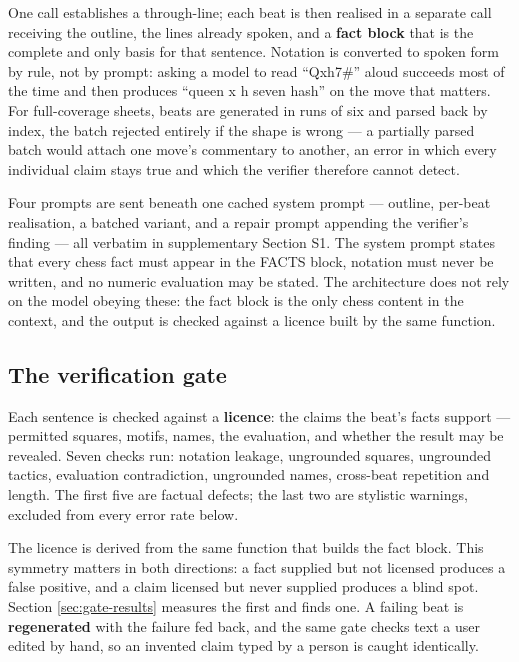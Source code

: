 \documentclass[conference]{IEEEtran}
\begin{document}
One call establishes a through-line; each beat is then realised in a
separate call receiving the outline, the lines already spoken, and a
\textbf{fact block} that is the complete and only basis for that sentence.
Notation is converted to spoken form by rule, not by prompt: asking a model
to read ``Qxh7\#'' aloud succeeds most of the time and then produces ``queen
x h seven hash'' on the move that matters. For full-coverage sheets, beats
are generated in runs of six and parsed back by index, the batch rejected
entirely if the shape is wrong --- a partially parsed batch would attach one
move's commentary to another, an error in which every individual claim stays
true and which the verifier therefore cannot detect.

Four prompts are sent beneath one cached system prompt --- outline, per-beat
realisation, a batched variant, and a repair prompt appending the verifier's
finding --- all verbatim in supplementary Section S1. The system prompt
states that every chess fact must appear in the FACTS block, notation must
never be written, and no numeric evaluation may be stated. The architecture
does not rely on the model obeying these: the fact block is the only chess
content in the context, and the output is checked against a licence built by
the same function.

\subsection{The verification gate}
\label{sec:gate}

Each sentence is checked against a \textbf{licence}: the claims the beat's
facts support --- permitted squares, motifs, names, the evaluation, and
whether the result may be revealed. Seven checks run: notation leakage,
ungrounded squares, ungrounded tactics, evaluation contradiction, ungrounded
names, cross-beat repetition and length. The first five are factual defects;
the last two are stylistic warnings, excluded from every error rate below.

The licence is derived from the same function that builds the fact block.
This symmetry matters in both directions: a fact supplied but not licensed
produces a false positive, and a claim licensed but never supplied produces
a blind spot. Section \ref{sec:gate-results} measures the first and finds
one. A failing beat is \textbf{regenerated} with the failure fed back, and
the same gate checks text a user edited by hand, so an invented claim typed
by a person is caught identically.
\end{document}
